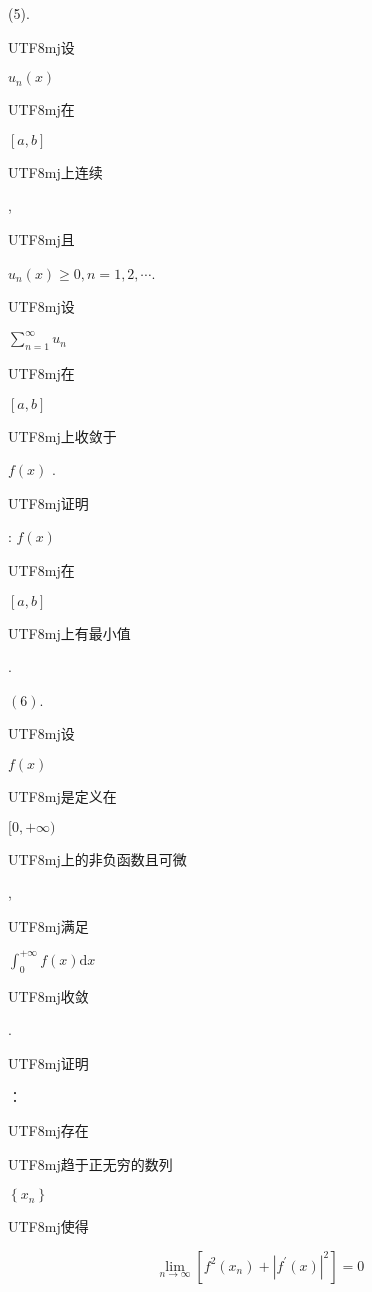 \documentclass[10pt]{article}
\begin{document}
(5). \begin{CJK}{UTF8}{mj}设\end{CJK} $u_{n}(x)$ \begin{CJK}{UTF8}{mj}在\end{CJK} $[a, b]$ \begin{CJK}{UTF8}{mj}上连续\end{CJK}, \begin{CJK}{UTF8}{mj}且\end{CJK} $u_{n}(x) \geq 0, n=1,2, \cdots$. \begin{CJK}{UTF8}{mj}设\end{CJK} $\sum_{n=1}^{\infty} u_{n}$ \begin{CJK}{UTF8}{mj}在\end{CJK} $[a, b]$ \begin{CJK}{UTF8}{mj}上收敛于\end{CJK} $f(x)$ . \begin{CJK}{UTF8}{mj}证明\end{CJK}: $f(x)$ \begin{CJK}{UTF8}{mj}在\end{CJK} $[a, b]$ \begin{CJK}{UTF8}{mj}上有最小值\end{CJK}.

$(6)$. \begin{CJK}{UTF8}{mj}设\end{CJK} $f(x)$ \begin{CJK}{UTF8}{mj}是定义在\end{CJK} $[0,+\infty)$ \begin{CJK}{UTF8}{mj}上的非负函数且可微\end{CJK}, \begin{CJK}{UTF8}{mj}满足\end{CJK} $\int_{0}^{+\infty} f(x) \mathrm{d} x$ \begin{CJK}{UTF8}{mj}收敛\end{CJK}. \begin{CJK}{UTF8}{mj}证明\end{CJK}：\begin{CJK}{UTF8}{mj}存在\end{CJK} \begin{CJK}{UTF8}{mj}趋于正无穷的数列\end{CJK} $\left\{x_{n}\right\}$ \begin{CJK}{UTF8}{mj}使得\end{CJK}
$$
\lim _{n \rightarrow \infty}\left[f^{2}\left(x_{n}\right)+\left|f^{\prime}(x)\right|^{2}\right]=0
$$
\end{document}
